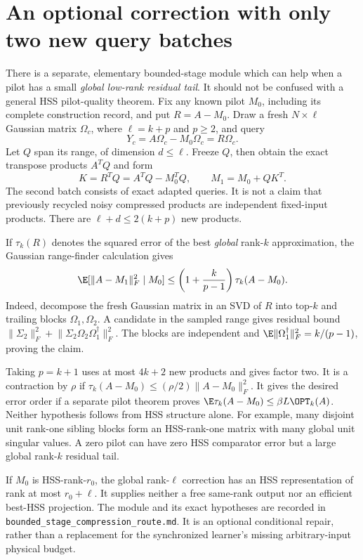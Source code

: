 \documentclass[11pt,oneside,openany,a4paper]{book}
\numberwithin{equation}{chapter}
\theoremstyle{definition}
\theoremstyle{remark}
\newcommand{\sourcefile}[1]{{\small\nolinkurl{#1}}}
\begin{document}
\section{An optional correction with only two new query batches}

There is a separate, elementary bounded-stage module which can help
when a pilot has a small \emph{global low-rank residual tail}.  It
should not be confused with a general HSS pilot-quality theorem.
Fix any known pilot $M_0$, including its complete construction record,
and put $R=A-M_0$.  Draw a fresh $N\times\ell$ Gaussian matrix
$\Omega_c$, where $\ell=k+p$ and $p\geq2$, and query
\[
 Y_c=A\Omega_c-M_0\Omega_c=R\Omega_c.
\]
Let $Q$ span its range, of dimension $d\leq\ell$.  Freeze $Q$, then
obtain the exact transpose products $A^TQ$ and form
\[
 K=R^TQ=A^TQ-M_0^TQ,
 \qquad M_1=M_0+QK^T.
\]
The second batch consists of exact adapted queries.  It is not a claim
that previously recycled noisy compressed products are independent
fixed-input products.  There are $\ell+d\leq2(k+p)$ new products.

If $\tau_k(R)$ denotes the squared error of the best \emph{global}
rank-$k$ approximation, the Gaussian range-finder calculation gives
\begin{equation}
 \E[\lVert A-M_1\rVert_F^2\mid M_0]
 \leq\left(1+\frac{k}{p-1}\right)\tau_k(A-M_0).
 \label{upd:eq:route-two-batch}
\end{equation}
Indeed, decompose the fresh Gaussian matrix in an SVD of $R$ into
top-$k$ and trailing blocks $\Omega_1,\Omega_2$.  A candidate in the
sampled range gives residual bound
$\lVert\Sigma_2\rVert_F^2+
 \lVert\Sigma_2\Omega_2\Omega_1^\dagger\rVert_F^2$.
The blocks are independent and
$\E\lVert\Omega_1^\dagger\rVert_F^2=k/(p-1)$, proving the claim.

Taking $p=k+1$ uses at most $4k+2$ new products and gives factor two.
It is a contraction by $\rho$ if
$\tau_k(A-M_0)\leq(\rho/2)\lVert A-M_0\rVert_F^2$.
It gives the desired error order if a separate pilot theorem proves
$\E\tau_k(A-M_0)\leq\beta L\OPT_k(A)$.
Neither hypothesis follows from HSS structure alone.  For example,
many disjoint unit rank-one sibling blocks form an HSS-rank-one matrix
with many global unit singular values.  A zero pilot can have zero HSS
comparator error but a large global rank-$k$ residual tail.

If $M_0$ is HSS-rank-$r_0$, the global rank-$\ell$ correction has an
HSS representation of rank at most $r_0+\ell$.  It supplies neither a
free same-rank output nor an efficient best-HSS projection.  The module
and its exact hypotheses are recorded in
\sourcefile{bounded_stage_compression_route.md}.  It is an optional
conditional repair, rather than a replacement for the synchronized
learner's missing arbitrary-input physical budget.
\end{document}
